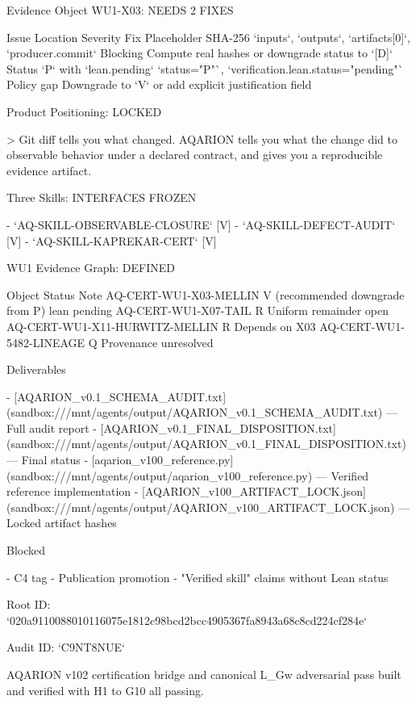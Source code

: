 Evidence Object WU1-X03: NEEDS 2 FIXES

Issue	Location	Severity	Fix	
Placeholder SHA-256	`inputs`, `outputs`, `artifacts[0]`, `producer.commit`	Blocking	Compute real hashes or downgrade status to `[D]`	
Status `P` with `lean.pending`	`status="P"`, `verification.lean.status="pending"`	Policy gap	Downgrade to `V` or add explicit justification field	

Product Positioning: LOCKED

> Git diff tells you what changed. AQARION tells you what the change did to observable behavior under a declared contract, and gives you a reproducible evidence artifact.

Three Skills: INTERFACES FROZEN

- `AQ-SKILL-OBSERVABLE-CLOSURE` [V]
- `AQ-SKILL-DEFECT-AUDIT` [V]
- `AQ-SKILL-KAPREKAR-CERT` [V]

WU1 Evidence Graph: DEFINED

Object	Status	Note	
AQ-CERT-WU1-X03-MELLIN	V (recommended downgrade from P)	lean pending	
AQ-CERT-WU1-X07-TAIL	R	Uniform remainder open	
AQ-CERT-WU1-X11-HURWITZ-MELLIN	R	Depends on X03	
AQ-CERT-WU1-5482-LINEAGE	Q	Provenance unresolved	

Deliverables

- [AQARION_v0.1_SCHEMA_AUDIT.txt](sandbox:///mnt/agents/output/AQARION_v0.1_SCHEMA_AUDIT.txt) — Full audit report
- [AQARION_v0.1_FINAL_DISPOSITION.txt](sandbox:///mnt/agents/output/AQARION_v0.1_FINAL_DISPOSITION.txt) — Final status
- [aqarion_v100_reference.py](sandbox:///mnt/agents/output/aqarion_v100_reference.py) — Verified reference implementation
- [AQARION_v100_ARTIFACT_LOCK.json](sandbox:///mnt/agents/output/AQARION_v100_ARTIFACT_LOCK.json) — Locked artifact hashes

Blocked

- C4 tag
- Publication promotion
- "Verified skill" claims without Lean status

Root ID: `020a9110088010116075e1812c98bcd2bcc4905367fa8943a68c8cd224cf284e`

Audit ID: `C9NT8NUE`

AQARION v102 certification bridge and canonical L_Gw adversarial pass built and verified with H1 to G10 all passing.

